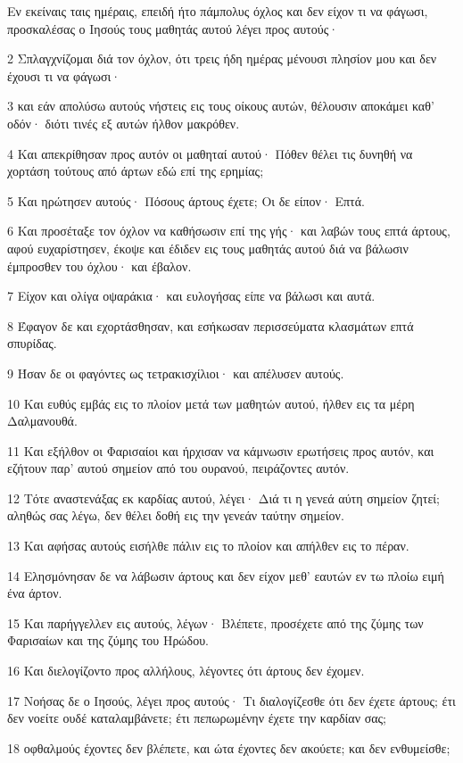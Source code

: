 \par Εν εκείναις ταις ημέραις, επειδή ήτο πάμπολυς όχλος και δεν είχον τι να φάγωσι, προσκαλέσας ο Ιησούς τους μαθητάς αυτού λέγει προς αυτούς·
\par 2 Σπλαγχνίζομαι διά τον όχλον, ότι τρεις ήδη ημέρας μένουσι πλησίον μου και δεν έχουσι τι να φάγωσι·
\par 3 και εάν απολύσω αυτούς νήστεις εις τους οίκους αυτών, θέλουσιν αποκάμει καθ' οδόν· διότι τινές εξ αυτών ήλθον μακρόθεν.
\par 4 Και απεκρίθησαν προς αυτόν οι μαθηταί αυτού· Πόθεν θέλει τις δυνηθή να χορτάση τούτους από άρτων εδώ επί της ερημίας;
\par 5 Και ηρώτησεν αυτούς· Πόσους άρτους έχετε; Οι δε είπον· Επτά.
\par 6 Και προσέταξε τον όχλον να καθήσωσιν επί της γής· και λαβών τους επτά άρτους, αφού ευχαρίστησεν, έκοψε και έδιδεν εις τους μαθητάς αυτού διά να βάλωσιν έμπροσθεν του όχλου· και έβαλον.
\par 7 Είχον και ολίγα οψαράκια· και ευλογήσας είπε να βάλωσι και αυτά.
\par 8 Έφαγον δε και εχορτάσθησαν, και εσήκωσαν περισσεύματα κλασμάτων επτά σπυρίδας.
\par 9 Ήσαν δε οι φαγόντες ως τετρακισχίλιοι· και απέλυσεν αυτούς.
\par 10 Και ευθύς εμβάς εις το πλοίον μετά των μαθητών αυτού, ήλθεν εις τα μέρη Δαλμανουθά.
\par 11 Και εξήλθον οι Φαρισαίοι και ήρχισαν να κάμνωσιν ερωτήσεις προς αυτόν, και εζήτουν παρ' αυτού σημείον από του ουρανού, πειράζοντες αυτόν.
\par 12 Τότε αναστενάξας εκ καρδίας αυτού, λέγει· Διά τι η γενεά αύτη σημείον ζητεί; αληθώς σας λέγω, δεν θέλει δοθή εις την γενεάν ταύτην σημείον.
\par 13 Και αφήσας αυτούς εισήλθε πάλιν εις το πλοίον και απήλθεν εις το πέραν.
\par 14 Ελησμόνησαν δε να λάβωσιν άρτους και δεν είχον μεθ' εαυτών εν τω πλοίω ειμή ένα άρτον.
\par 15 Και παρήγγελλεν εις αυτούς, λέγων· Βλέπετε, προσέχετε από της ζύμης των Φαρισαίων και της ζύμης του Ηρώδου.
\par 16 Και διελογίζοντο προς αλλήλους, λέγοντες ότι άρτους δεν έχομεν.
\par 17 Νοήσας δε ο Ιησούς, λέγει προς αυτούς· Τι διαλογίζεσθε ότι δεν έχετε άρτους; έτι δεν νοείτε ουδέ καταλαμβάνετε; έτι πεπωρωμένην έχετε την καρδίαν σας;
\par 18 οφθαλμούς έχοντες δεν βλέπετε, και ώτα έχοντες δεν ακούετε; και δεν ενθυμείσθε;
